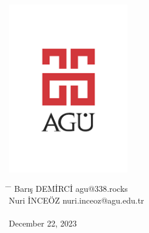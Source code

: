 \begin{center}
	\includegraphics[width=0.4\textwidth]{./assets/agu.png}

	\Huge
	\textbf{\paperTitle}

	\vspace{0.3cm}
	\Huge
	\paperSubTitle{}

	\vspace{0.8cm}
	\large
	\vspace{0.5cm}
	\LARGE
	\vspace{1.5cm}
	\textbf{}
	\vfill
	\vspace{0.8cm}
	\Large
\end{center}

\begin{tabbing}
	\hspace*{1em}\= \hspace*{8em} \= \kill
	\> Barış DEMİRCİ \> agu@338.rocks \\
	\> Nuri İNCEÖZ \> nuri.inceoz@agu.edu.tr \\
	\> \> \\
	\> December 22, 2023 \> \\
\end{tabbing}
